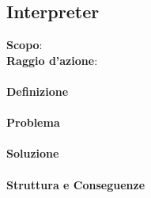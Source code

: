 \subsection{Interpreter}
\label{interpreter}

\textbf{Scopo}:  \\
\textbf{Raggio d'azione}: 

\paragraph{Definizione}

\paragraph{Problema}

\paragraph{Soluzione} 

\paragraph{Struttura e Conseguenze} 

\newpage